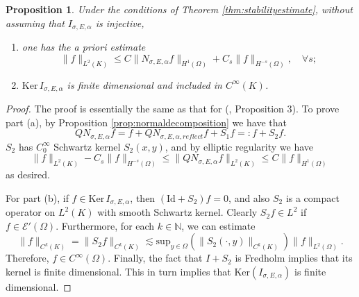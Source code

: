 \documentclass[10pt]{amsart}
\newtheorem{proposition}{Proposition}
\theoremstyle{definition}
\theoremstyle{definition}
\theoremstyle{definition}
\begin{document}
\begin{proposition}Under the conditions of Theorem \ref{thm:stabilityestimate}, without assuming that $I_{\sigma, E, \alpha}$ is injective,
\begin{enumerate}
\item[(a)] one has the a priori estimate
\begin{equation*}
\|f\|_{L^{2}(K)} \leq C\|N_{\sigma, E, \alpha}f\|_{H^{1}(\Omega)} + C_{s}\|f\|_{H^{-s}(\Omega)}, \quad \forall s;
\end{equation*}
\item[(b)]  $\mathrm{Ker}{\, I_{\sigma, E, \alpha}}$ is finite dimensional and included in $C^{\infty}(K)$.
\end{enumerate} \label{prop:aprioristability}
\end{proposition}
\begin{proof}The proof is essentially the same as that for (\cite{xraygeneric}, Proposition 3). To prove part (a), by Proposition \ref{prop:normaldecomposition} we have that
\begin{equation*}
QN_{\sigma, E, \alpha}f = f + QN_{\sigma, E, \alpha, reflect}f + S_{1}f =: f + S_{2}f.
\end{equation*}
$S_{2}$ has $C_{0}^{\infty}$ Schwartz kernel $S_{2}(x,y)$, and by elliptic regularity we have
\begin{equation*}
\|f\|_{L^{2}(K)} - C_{s}\|f\|_{H^{-s}(\Omega)} \leq \|QN_{\sigma, E, \alpha}f\|_{L^{2}(K)} \leq C \|f\|_{H^{1}(\Omega)}
\end{equation*}
as desired.

For part (b), if $f \in \mathrm{Ker}{\, I_{\sigma, E, \alpha} }$, then $(\mathrm{Id} + S_{2})f = 0$, and also $S_{2}$ is a compact operator on $L^{2}(K)$ with smooth Schwartz kernel. Clearly $S_{2}f \in L^{2}$ if $f \in \mathcal{E}'(\Omega)$. Furthermore, for each $k \in \mathbb{N}$, we can estimate
\begin{equation}
\|f\|_{C^{k}(K)}= \|S_{2}f\|_{C^{k}(K)} \lesssim \mathrm{sup}_{y\in \Omega}\left( \|S_{2}(\cdot, y)\|_{C^{k}(K)} \right) \|f\|_{L^{2}(\Omega)}.
\end{equation}
Therefore, $f \in C^{\infty}(\Omega)$. Finally, the fact that $I+S_{2}$ is Fredholm implies that its kernel is finite dimensional. This in turn implies that $\mathrm{Ker}(I_{\sigma, E, \alpha})$ is finite dimensional.\end{proof}
\end{document}

